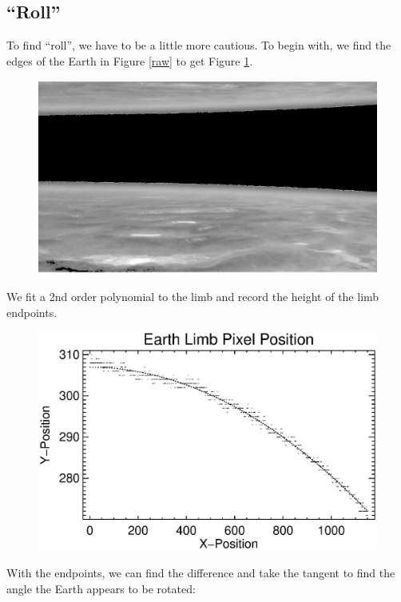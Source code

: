 \documentclass[10pt]{article}
\begin{document}
\subsection{``Roll''} %
\label{sub:roll}

To find ``roll'', we have to be a little more cautious. To begin with, we find the edges of the Earth in Figure \ref{raw} to get Figure \ref{earthlimb}.

\begin{figure}[!h]
    \centering
    \includegraphics[width=.9\textwidth]{../plots_tables_images/ama.eps}
    \label{earthlimb}
\end{figure}

We fit a 2nd order polynomial to the limb and record the height of the limb endpoints. 

\begin{figure}[!h]
    \centering
    \includegraphics[width=.9\textwidth]{../plots_tables_images/earth_limb.eps}
    \label{limbfit}
\end{figure}

With the endpoints, we can find the difference and take the tangent to find the angle the Earth appears to be rotated:
\end{document}

